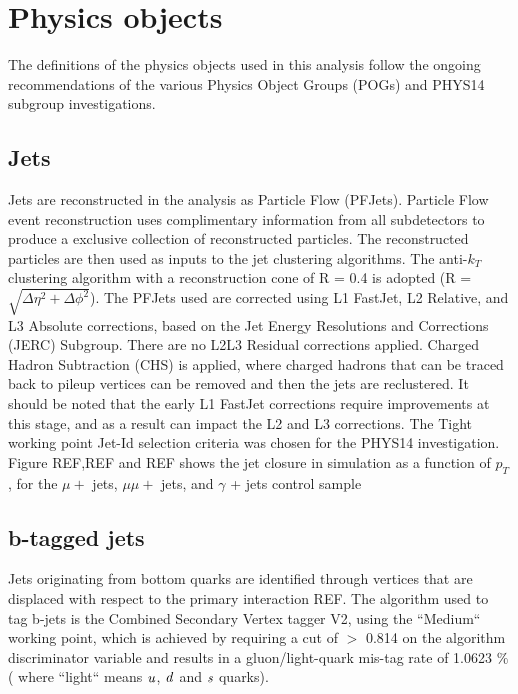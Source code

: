 \section{Physics objects}
\label{sec:objects}
The definitions of the physics objects used in this analysis follow the ongoing recommendations of the various Physics Object Groups (POGs) and PHYS14 subgroup investigations. 
\subsection{Jets}
Jets are reconstructed in the analysis as Particle Flow (PFJets). Particle Flow event reconstruction uses complimentary information from all subdetectors to produce a exclusive collection of reconstructed particles. The reconstructed particles are then used as inputs to the jet clustering algorithms. The anti-$k_{T}$ clustering algorithm with a reconstruction cone of R = 0.4 is adopted (R = $\sqrt{\Delta \eta^{2} + \Delta \phi^{2}   }$). The PFJets used are corrected using L1 FastJet, L2 Relative, and L3 Absolute corrections, based on the Jet Energy Resolutions and Corrections (JERC) Subgroup. There are no L2L3 Residual corrections applied. Charged Hadron Subtraction (CHS) is applied, where charged hadrons that can be traced back to pileup vertices can be removed and then the jets are reclustered. 
It should be noted that the early L1 FastJet corrections require improvements at this stage, and as a result can impact the L2 and L3 corrections. The Tight working point Jet-Id selection criteria was chosen for the PHYS14 investigation. Figure REF,REF and REF shows the jet closure in simulation as a function of $p_{T}$, for the $\mu +$ jets, $\mu\mu +$ jets, and $\gamma$ + jets control sample

\subsection{b-tagged jets}
Jets originating from bottom quarks are identified through vertices that are displaced with respect to the primary interaction REF. The algorithm used to tag b-jets is the Combined Secondary Vertex tagger V2, using the ``Medium`` working point, which is achieved by requiring a cut of $>$ 0.814 on the algorithm discriminator variable and results in a gluon/light-quark mis-tag rate of 1.0623 $\%$ ( where ``light`` means $\it{u}$, $\it{d}$ and $\it{s}$ quarks).



